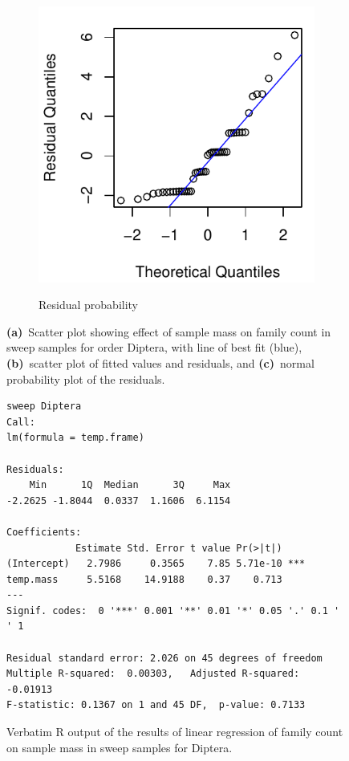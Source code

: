 \documentclass[10pt,letterpaper,twocolumn]{article}
\begin{document}
\begin{figure}[h]
\begin{subfigure}[b]{0.15\textwidth}
		\label{fig:sweep_diptera_resid}
	\end{subfigure}
	~
	\begin{subfigure}[b]{0.15\textwidth}
		\caption{Residual probability}
		\includegraphics[width=\textwidth]{plots/mass-vs-count/qqplot/2015_sweep_Diptera_qqplot.pdf}
		\label{fig:sweep_diptera_qqplot}
	\end{subfigure}
	\caption{\textbf{(a)}~Scatter plot showing effect of sample mass on family count in sweep samples for order Diptera, with line of best fit (blue), \textbf{(b)}~scatter plot of fitted values and residuals, and \textbf{(c)}~normal probability plot of the residuals.}
	\label{fig:sweep_diptera}
	\smallskip
	\nointerlineskip
	\hrulefill
\end{figure}

\begin{figure}[h]
	\lstset{numbers=left}
	\lstset{xleftmargin=5mm,framexleftmargin=5mm}
	\begin{lstlisting}
sweep Diptera
Call:
lm(formula = temp.frame)

Residuals:
    Min      1Q  Median      3Q     Max 
-2.2625 -1.8044  0.0337  1.1606  6.1154 

Coefficients:
            Estimate Std. Error t value Pr(>|t|)    
(Intercept)   2.7986     0.3565    7.85 5.71e-10 ***
temp.mass     5.5168    14.9188    0.37    0.713    
---
Signif. codes:  0 '***' 0.001 '**' 0.01 '*' 0.05 '.' 0.1 ' ' 1

Residual standard error: 2.026 on 45 degrees of freedom
Multiple R-squared:  0.00303,	Adjusted R-squared:  -0.01913 
F-statistic: 0.1367 on 1 and 45 DF,  p-value: 0.7133
	\end{lstlisting}
	\caption{Verbatim R output of the results of linear regression of family count on sample mass in sweep samples for Diptera.}
	\label{fig:sweep_diptera_regression}
	\smallskip
	\nointerlineskip
	\hrulefill
\end{figure}
\end{document}
